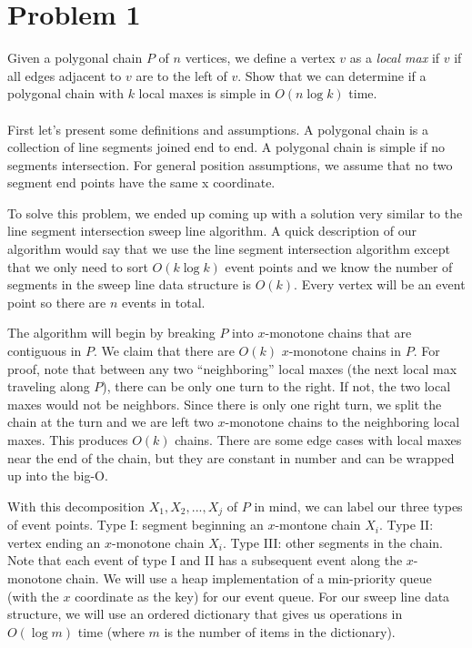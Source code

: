 \documentclass[11pt]{article}
\begin{document}

\newpage
\section*{Problem 1}

Given a polygonal chain $P$ of $n$ vertices, we define a vertex $v$ as a
\emph{local max} if $v$ if all edges adjacent to $v$ are to the left of $v$.
Show that we can determine if a polygonal chain with $k$ local maxes is simple in
$O(n \log k)$ time. \\\\
\answer
First let's present some definitions and assumptions.
A polygonal chain is a collection of line segments joined end to end.
A polygonal chain is simple if no segments intersection.
For general position assumptions, we assume that no two segment end points have the same x coordinate.

To solve this problem, we ended up coming up with a solution very similar to the line segment intersection sweep line algorithm.
A quick description of our algorithm would say that we use the line segment intersection algorithm except that we only need to sort $O(k \log k)$ event points and we know the number of segments in the sweep line data structure is $O(k)$.
Every vertex will be an event point so there are $n$ events in total.

The algorithm will begin by breaking $P$ into $x$-monotone chains that are contiguous in $P$.
We claim that there are $O(k)$ $x$-monotone chains in $P$.
For proof, note that between any two ``neighboring'' local maxes (the next local max traveling along $P$), there can be only one turn to the right.
If not, the two local maxes would not be neighbors.
Since there is only one right turn, we split the chain at the turn and we are left two $x$-monotone chains to the neighboring local maxes.
This produces $O(k)$ chains.
There are some edge cases with local maxes near the end of the chain, but they are constant in number and can be wrapped up into the big-O.

With this decomposition $X_1, X_2, ..., X_j$ of $P$ in mind, we can label our three types of event points.
Type I: segment beginning an $x$-montone chain $X_i$.
Type II: vertex ending an $x$-monotone chain $X_i$.
Type III: other segments in the chain.
Note that each event of type I and II has a subsequent event along the $x$-monotone chain.
We will use a heap implementation of a min-priority queue (with the $x$ coordinate as the key) for our event queue.
For our sweep line data structure, we will use an ordered dictionary that gives us operations in $O(\log m)$ time (where $m$ is the number of items in the dictionary).
\end{document}
